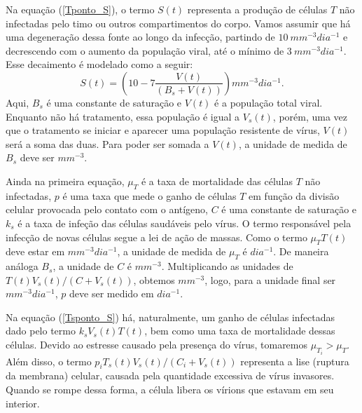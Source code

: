 Na equação (\ref{Tponto_S}), o termo \( S ( t ) \) representa a produção de células \( T \) não infectadas pelo timo ou outros compartimentos do corpo.
Vamos assumir que há uma degeneração dessa fonte ao longo da infecção, partindo de \( 10 \ \unit{mm^{ -3 } dia^{ -1 }} \) e decrescendo com o aumento da população viral, até o mínimo de \( 3 \ \unit{mm^{ -3 } dia^{ -1 }} \).
Esse decaimento é modelado como a seguir:
\begin{equation}
    S ( t ) = \left(
        10  - 7 \frac{ V ( t ) }{ ( B_{ s } + V ( t ) ) } 
    \right)
    \unit{mm^{ -3 } dia^{ -1 }}
.\end{equation}
Aqui, \( B_{ s } \) é uma constante de saturação e \( V ( t ) \) é a população total viral.
Enquanto não há tratamento, essa população é igual a \( V_{ s } ( t ) \), porém, uma vez que o tratamento se iniciar e aparecer uma população resistente de vírus, \( V ( t ) \) será a soma das duas.
Para poder ser somada a \( V ( t ) \), a unidade de medida de \( B_{ s } \) deve ser \( \unit{mm^{ -3 }} \).

Ainda na primeira equação, \( \mu_{ T } \) é a taxa de mortalidade das células \( T \) não infectadas, \( p \) é uma taxa que mede o ganho de células \( T \) em função da divisão celular provocada pelo contato com o antígeno, \( C \) é uma constante de saturação e \( k_{ s } \) é a taxa de infeção das células saudáveis pelo vírus.
O termo responsável pela infecção de novas células segue a lei de ação de massas.
Como o termo \( \mu_{ T } T ( t ) \) deve estar em \( \unit{mm^{ -3 } dia^{ -1 }} \), a unidade de medida de \( \mu_{ T } \) é \( \unit{dia^{ -1 }} \).
De maneira análoga \( B_{ s } \), a unidade de \( C \) é \( \unit{mm^{ -3 }} \).
Multiplicando as unidades de \( T ( t ) V_{ s } ( t ) / ( C + V_{ s } ( t ) ) \), obtemos \( \unit{mm^{ -3 }} \), logo, para a unidade final ser \( \unit{mm^{ -3 } dia^{ -1 }} \), \( p \) deve ser medido em \( \unit{dia^{ -1 }} \).


Na equação (\ref{Tsponto_S}) há, naturalmente, um ganho de células infectadas dado pelo termo \( k_{ s } V_{ s } ( t ) T ( t ) \), bem como uma taxa de mortalidade dessas células.
Devido ao estresse causado pela presença do vírus, tomaremos \( \mu_{ T_{ i } } > \mu_{ T } \).
Além disso, o termo \( p_{ i } T_{ s } ( t ) V_{ s } ( t ) / ( C_{ i } + V_{ s } ( t ) ) \) representa a lise (ruptura da membrana) celular, causada pela quantidade excessiva de vírus invasores.
Quando se rompe dessa forma, a célula libera os vírions que estavam em seu interior.

